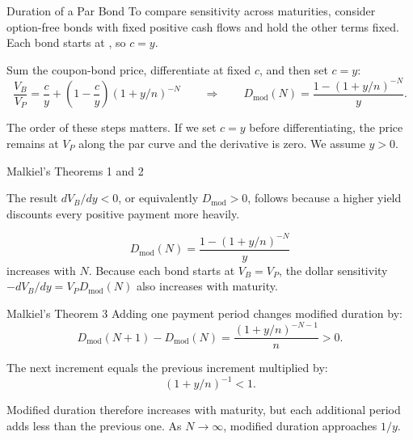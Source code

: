 \documentclass[aspectratio=169,11pt]{beamer}
\begin{document}
\begin{frame}{Duration of a Par Bond}
  \vspace{0.2em}
  To compare sensitivity across maturities, consider option-free bonds with
  fixed positive cash flows and hold the other terms fixed. Each bond starts at
  , so $c=y$.

  \vspace{0.4em}
  Sum the coupon-bond price, differentiate at fixed $c$, and then set $c=y$:
  \[
    \frac{V_B}{V_P}=\frac{c}{y}+\left(1-\frac{c}{y}\right)\left(1+y/n\right)^{-N}
    \qquad\Longrightarrow\qquad
    D_{\mathrm{mod}}(N)=\frac{1-\left(1+y/n\right)^{-N}}{y} .
  \]

  \vspace{0.4em}
  The order of these steps matters. If we set $c=y$ before differentiating, the
  price remains at $V_P$ along the par curve and the derivative is zero. We
  assume $y>0$.
\end{frame}

\begin{frame}{Malkiel's Theorems 1 and 2}
  \vspace{0.4em}
  {\large\textbf{}}

  \vspace{0.2em}
  The result $dV_B/dy<0$, or equivalently $D_{\mathrm{mod}}>0$, follows because
  a higher yield discounts every positive payment more heavily.

  \vspace{0.8em}
  {\large\textbf{}}

  \vspace{0.2em}
  \[
    D_{\mathrm{mod}}(N)=\frac{1-(1+y/n)^{-N}}{y}
  \]
  increases with $N$. Because each bond starts at $V_B=V_P$, the dollar
  sensitivity $-dV_B/dy=V_PD_{\mathrm{mod}}(N)$ also increases with maturity.
\end{frame}

\begin{frame}{Malkiel's Theorem 3}
  \vspace{0.5em}
  Adding one payment period changes modified duration by:
  \[
    D_{\mathrm{mod}}(N+1)-D_{\mathrm{mod}}(N)
    =\frac{(1+y/n)^{-N-1}}{n}>0.
  \]

  \vspace{0.5em}
  The next increment equals the previous increment multiplied by:
  \[
    (1+y/n)^{-1}<1.
  \]

  Modified duration therefore increases with maturity, but each additional
  period adds less than the previous one. As $N\rightarrow\infty$, modified
  duration approaches $1/y$.

\end{frame}
\end{document}

